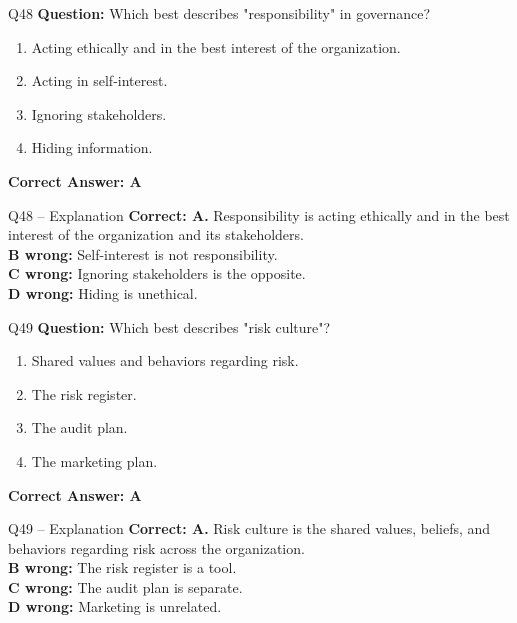 \documentclass[aspectratio=169,10pt]{beamer}
\begin{document}
	\begin{frame}[t]{Q48}
		\small
		\textbf{Question:} Which best describes "responsibility" in governance?
		\begin{enumerate}[label=\Alph*.,itemsep=1pt,topsep=2pt]
			\item Acting ethically and in the best interest of the organization.
			\item Acting in self-interest.
			\item Ignoring stakeholders.
			\item Hiding information.
		\end{enumerate}
		\vspace{4pt}
		\textbf{Correct Answer: A}
	\end{frame}
	
	\begin{frame}[t]{Q48 -- Explanation}
		\small
		\textbf{Correct: A.} Responsibility is acting ethically and in the best interest of the organization and its stakeholders. \\[4pt]
		\textbf{B wrong:} Self-interest is not responsibility. \\[2pt]
		\textbf{C wrong:} Ignoring stakeholders is the opposite. \\[2pt]
		\textbf{D wrong:} Hiding is unethical.
	\end{frame}
	
	\begin{frame}[t]{Q49}
		\small
		\textbf{Question:} Which best describes "risk culture"?
		\begin{enumerate}[label=\Alph*.,itemsep=1pt,topsep=2pt]
			\item Shared values and behaviors regarding risk.
			\item The risk register.
			\item The audit plan.
			\item The marketing plan.
		\end{enumerate}
		\vspace{4pt}
		\textbf{Correct Answer: A}
	\end{frame}
	
	\begin{frame}[t]{Q49 -- Explanation}
		\small
		\textbf{Correct: A.} Risk culture is the shared values, beliefs, and behaviors regarding risk across the organization. \\[4pt]
		\textbf{B wrong:} The risk register is a tool. \\[2pt]
		\textbf{C wrong:} The audit plan is separate. \\[2pt]
		\textbf{D wrong:} Marketing is unrelated.
	\end{frame}
	
\end{document}
